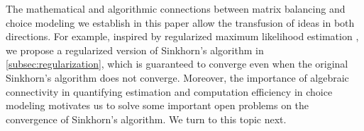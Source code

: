 The mathematical and algorithmic connections between matrix balancing and choice modeling we establish in this paper allow the transfusion of ideas in both directions. For example, inspired by regularized maximum likelihood estimation \citep{maystre2017choicerank}, we propose a regularized version of Sinkhorn's algorithm in \cref{subsec:regularization}, which is guaranteed to converge even when the original Sinkhorn's algorithm does not converge. Moreover, the importance of algebraic connectivity in quantifying estimation and computation efficiency in choice modeling motivates us to solve some important open problems on the convergence of Sinkhorn's algorithm. We turn to this topic next. 
